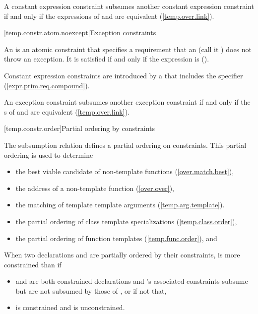 \pnum
A constant expression constraint  subsumes
another constant expression constraint  if and
only if the expressions of  and 
are equivalent (\ref{temp.over.link}). 


[temp.constr.atom.noexcept]{Exception constraints}

\pnum
An  is an atomic constraint
that specifies a requirement that an
(call it ) does not throw an exception.
It is satisfied if and only if the expression 
is 
().
          
\enternote
Constant expression constraints are introduced by a
 that
includes the  specifier
(\ref{expr.prim.req.compound}).
\exitnote
          

\pnum
An exception constraint  subsumes another
exception constraint  if and only if the
s of 
and  are equivalent 
(\ref{temp.over.link}). 


[temp.constr.order]{Partial ordering by constraints}


\pnum
The subsumption relation defines a partial ordering on constraints. 
      This partial ordering is used to determine 

\begin{itemize}
\item the best viable candidate of non-template functions
(\ref{over.match.best}), 
\item the address of a non-template function
(\ref{over.over}), 
\item the matching of template template arguments
(\ref{temp.arg.template}).
\item the partial ordering of class template specializations
(\ref{temp.class.order}), 
\item the partial ordering of function templates
(\ref{temp.func.order}), and 
\end{itemize}

\pnum
When two declarations  and  are
partially ordered by their constraints,  is more
constrained than  if

\begin{itemize}
\item {} and  are both constrained
declarations and 's associated constraints subsume but 
are not subsumed by those of , or if not that, 

\item {} is constrained and  is
unconstrained. 
\end{itemize}

